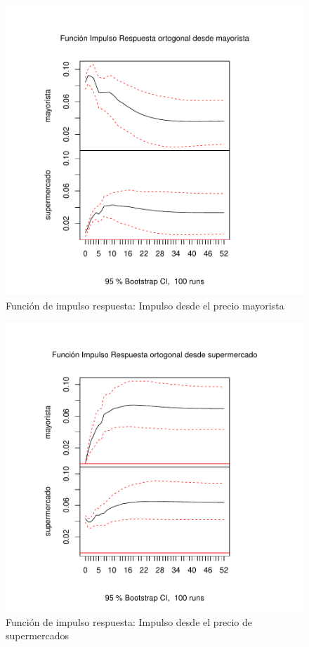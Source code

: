\begin{figure}[H]
\centering
\caption{Función de impulso respuesta: Impulso desde el precio mayorista}
\includegraphics[scale=0.7]{fig_results/fig2.pdf}
\end{figure}

\begin{figure}[H]
\centering
\caption{Función de impulso respuesta: Impulso desde el precio de supermercados}
\includegraphics[scale=0.7]{fig_results/fig3.pdf}
\end{figure}

